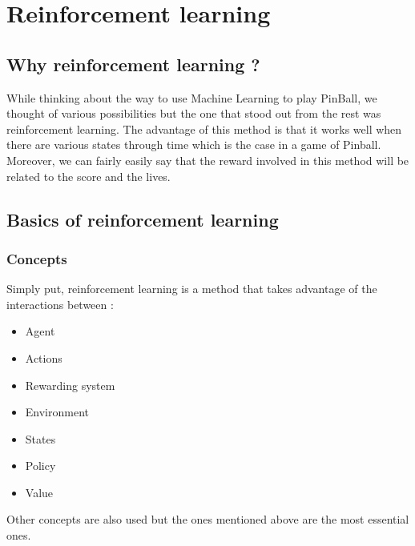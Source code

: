 \documentclass[a4paper,12pt,calibri,oneside,openany]{book}
\theoremstyle{break}
\begin{document}

\frontmatter



\tableofcontents

\mainmatter
\pagestyle{fancy}
\chapter{Reinforcement learning}
\section{Why reinforcement learning ?}
\qquad While thinking about the way to use Machine Learning to play PinBall, we thought of various possibilities but the one that stood out from the rest was reinforcement learning. The advantage of this method is that it works well when there are various states through time which is the case in a game of Pinball. Moreover, we can fairly easily say that the reward involved in this method will be related to the score and the lives.
\section{Basics of reinforcement learning}
\subsection{Concepts}
\qquad Simply put, reinforcement learning is a method that takes advantage of the interactions between : 
\begin{itemize}
	\item Agent
	\item Actions
	\item Rewarding system
	\item Environment
	\item States
	\item Policy
	\item Value
\end{itemize}

Other concepts are also used but the ones mentioned above are the most essential ones.\\
\end{document}
